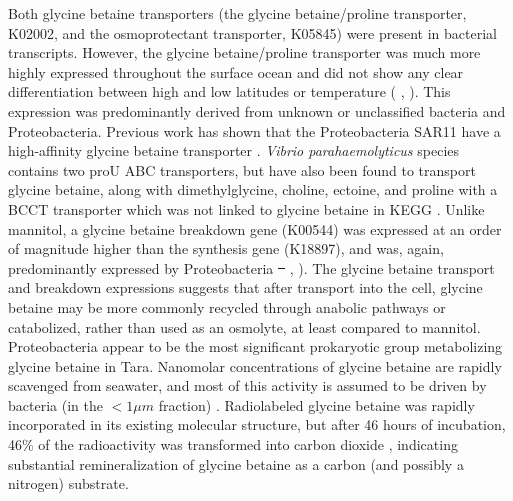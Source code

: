 \documentclass[utf8]{frontiersSCNS} %
\providecommand{\DIFaddtex}[1]{{\protect\color{blue}\uwave{#1}}} %
\providecommand{\DIFdeltex}[1]{{\protect\color{red}\sout{#1}}}                      %
\providecommand{\DIFaddbegin}{} %
\providecommand{\DIFaddend}{} %
\providecommand{\DIFdelbegin}{} %
\providecommand{\DIFdelend}{} %
\providecommand{\DIFadd}[1]{\texorpdfstring{\DIFaddtex{#1}}{#1}} %
\providecommand{\DIFdel}[1]{\texorpdfstring{\DIFdeltex{#1}}{}} %
\begin{document}
Both glycine betaine transporters (the glycine betaine/proline transporter, K02002, and the osmoprotectant transporter, K05845) were present in bacterial transcripts. However, the glycine betaine/proline transporter was much more highly expressed throughout the surface ocean and did not show any clear differentiation between high and low latitudes or temperature ( \DIFaddbegin \DIFadd{B}\DIFaddend , ). This expression was predominantly derived from unknown or unclassified bacteria and Proteobacteria. Previous work has shown that the Proteobacteria SAR11 have a high-affinity glycine betaine transporter \citep{Noell2019}. \emph{Vibrio parahaemolyticus} species contains two proU ABC transporters, but have also been found to transport glycine betaine, along with dimethylglycine, choline, ectoine, and proline with a BCCT transporter which was not linked to glycine betaine in KEGG \citep{Gregory2020}. Unlike mannitol, a glycine betaine breakdown gene (K00544) was expressed at an order of magnitude higher than the synthesis gene (K18897), and was, again, predominantly expressed by Proteobacteria \DIFdelbegin \DIFdel{\mbox{%
}%
}\DIFdelend \DIFaddbegin \DIFadd{(\mbox{%
\Cref{fig:tarabact} }%
B}\DIFaddend , ). The glycine betaine transport and breakdown expressions suggests that after transport into the cell, glycine betaine may be more commonly recycled through anabolic pathways or catabolized, rather than used as an osmolyte, at least compared to mannitol. Proteobacteria appear to be the most significant prokaryotic group metabolizing glycine betaine in Tara. Nanomolar concentrations of glycine betaine are rapidly scavenged from seawater, and most of this activity is assumed to be driven by bacteria (in the $<1\mu m$ fraction) \citep{Kiene1998}. Radiolabeled glycine betaine was rapidly incorporated in its existing molecular structure, but after 46 hours of incubation, 46\% of the radioactivity was transformed into carbon dioxide \citep{Kiene1998}, indicating substantial remineralization of glycine betaine as a carbon (and possibly a nitrogen) substrate.
\end{document}
